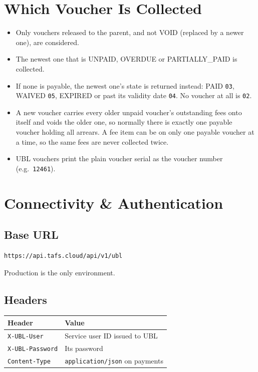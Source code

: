 \documentclass[11pt]{article}
\begin{document}
\section{Which Voucher Is Collected}\label{sec:latest}
\begin{itemize}[nosep]
  \item Only vouchers released to the parent, and not VOID (replaced by a newer one), are considered.
  \item The newest one that is UNPAID, OVERDUE or PARTIALLY\_PAID is collected.
  \item If none is payable, the newest one's state is returned instead: PAID \texttt{03}, WAIVED \texttt{05},
        EXPIRED or past its validity date \texttt{04}. No voucher at all is \texttt{02}.
  \item A new voucher carries every older unpaid voucher's outstanding fees onto itself and voids the older one, so
        normally there is exactly one payable voucher holding all arrears. A fee item can be on only one payable
        voucher at a time, so the same fees are never collected twice.
  \item UBL vouchers print the plain voucher serial as the voucher number (e.g.\ \texttt{12461}).
\end{itemize}

\section{Connectivity \& Authentication}
\subsection{Base URL}
\begin{lstlisting}
https://api.tafs.cloud/api/v1/ubl
\end{lstlisting}
Production is the only environment.

\subsection{Headers}
\begin{center}
\begin{tabular}{@{}ll@{}}
\toprule
\textbf{Header} & \textbf{Value} \\
\midrule
\texttt{X-UBL-User} & Service user ID issued to UBL \\
\texttt{X-UBL-Password} & Its password \\
\texttt{Content-Type} & \texttt{application/json} on payments \\
\bottomrule
\end{tabular}
\end{center}
\end{document}
